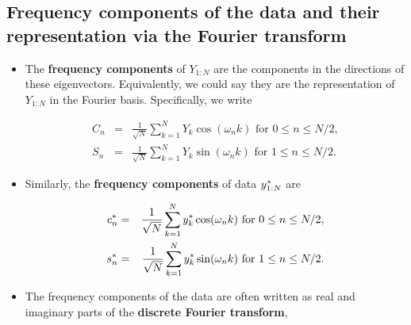 \documentclass[]{article}
\begin{document}
\subsection{Frequency components of the data and their representation
via the Fourier
transform}\label{frequency-components-of-the-data-and-their-representation-via-the-fourier-transform}

\begin{itemize}
\item
  The \textbf{frequency components} of \(Y_{1:N}\) are the components in
  the directions of these eigenvectors. Equivalently, we could say they
  are the representation of \(Y_{1:N}\) in the Fourier basis.
  Specifically, we write

  \begin{eqnarray}
  C_n &=& \frac{1}{\sqrt{N}}\sum_{k=1}^N Y_k\cos(\omega_n k) \mbox{ for $0\le n\le N/2$},
  \\
  S_n &=& \frac{1}{\sqrt{N}}\sum_{k=1}^N Y_k\sin(\omega_n k) \mbox{ for $1\le n\le N/2$}.
  \end{eqnarray}
\item
  Similarly, the \textbf{frequency components} of data
  \(y_{1:N}^*\) are

  \begin{eqnarray}
  c_n^* &=& \frac{1}{\sqrt{N}}\sum_{k=1}^N y_k^*\cos(\omega_n k) \mbox{ for $0\le n\le N/2$},
  \\
  s_n^* &=& \frac{1}{\sqrt{N}}\sum_{k=1}^N y_k^*\sin(\omega_n k) \mbox{ for $1\le n\le N/2$}.
  \end{eqnarray}
\item
  The frequency components of the data are often written as real and
  imaginary parts of the \textbf{discrete Fourier transform},


\end{itemize}
\end{document}
